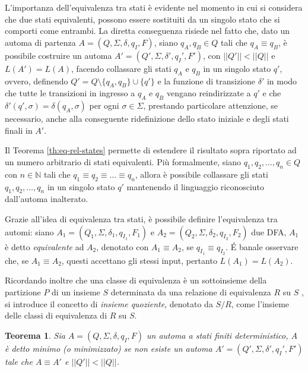 \documentclass[a4paper,12pt]{report} %
\newtheorem{theorem}{Teorema}[chapter]        %
\begin{document}
L'importanza dell'equivalenza tra stati è evidente nel momento in cui si considera che
due stati equivalenti, possono essere sostituiti da un singolo stato che si comporti come entrambi.
La diretta conseguenza risiede nel fatto che, dato un automa di partenza $A = (Q, \Sigma, \delta, q_I, F)$, 
siano $q_A, q_B \in Q$ tali che $q_A \equiv q_B$, è possibile costruire un automa $A' = (Q', \Sigma, \delta', q_I', F')$,
con $||Q'|| < ||Q||$ e $L(A') = L(A)$, facendo collassare gli stati $q_A$ e $q_B$ in un singolo stato $q'$, ovvero, definendo
$Q' = Q \setminus \{q_A, q_B\} \cup \{q'\}$ e la funzione di transizione $\delta'$
in modo che tutte le transizioni in ingresso a $q_A$ e $q_B$ vengano reindirizzate a $q'$ e che
$\delta'(q', \sigma) = \delta(q_A, \sigma)$ per ogni $\sigma \in \Sigma$, prestando particolare attenzione,
se necessario, anche alla conseguente ridefinizione dello stato iniziale e degli stati finali in $A'$.

Il Teorema \ref{th:eq-rel-states} permette di estendere il risultato sopra riportato ad un numero arbitrario di
stati equivalenti. Più formalmente, siano $q_1, q_2, \dots, q_n \in Q$ con $n \in \mathbb{N}$ tali che
$q_1 \equiv q_2 \equiv \dots \equiv q_n$, allora è possibile collassare gli stati $q_1, q_2, \dots, q_n$ in un
singolo stato $q'$ mantenendo il linguaggio riconosciuto dall'automa inalterato.

Grazie all'idea di equivalenza tra stati, è possibile definire l'equivalenza tra automi: siano
$A_1 = (Q_1, \Sigma, \delta_1, q_{I_1}, F_1)$ e $A_2 = (Q_2, \Sigma, \delta_2, q_{I_2}, F_2)$ due DFA, 
$A_1$ è detto \emph{equivalente} ad $A_2$, denotato con $A_1 \equiv A_2$, se $q_{I_1} \equiv q_{I_2}$.
É banale osservare che, se $A_1 \equiv A_2$, questi accettano gli stessi input, pertanto $L(A_1) = L(A_2)$.

Ricordando inoltre che una classe di equivalenza è un sottoinsieme della partizione $P$ di un insieme $S$ determinata da
una relazione di equivalenza $R$ su $S$ \parencite{Ros18}, si introduce il concetto di \emph{insieme quoziente},
denotato da $S \slash R$, come l'insieme delle classi di equivalenza di $R$ su $S$.

\begin{theorem}
  \label{th:min-dfa}
  Sia $A = (Q, \Sigma, \delta, q_I, F)$ un automa a stati finiti deterministico, $A$ è detto \emph{minimo}
  (o \emph{minimizzato}) se non esiste un automa $A' = (Q', \Sigma, \delta', q_I', F')$ tale che $A \equiv A'$ e $||Q'|| < ||Q||$.
\end{theorem}
\end{document}
